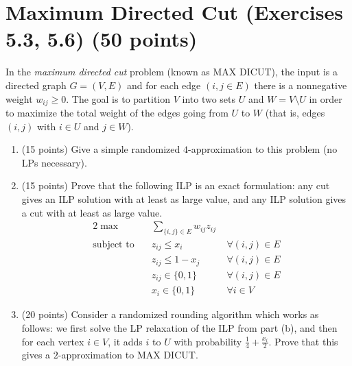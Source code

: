 \documentclass[11pt]{article}
\begin{document}
\section{Maximum Directed Cut (Exercises 5.3, 5.6) (50 points)}
In the \emph{maximum directed cut} problem (known as MAX DICUT), the input is a directed graph $G = (V, E)$ and for each edge $(i,j \in E)$ there is a nonnegative weight $w_{ij} \geq 0$.  The goal is to partition $V$ into two sets $U$ and $W = V \setminus U$ in order to maximize the total weight of the edges going from $U$ to $W$ (that is, edges $(i,j)$ with $i \in U$ and $j \in W$).

\begin{enumerate}
\item (15 points) Give a simple randomized $4$-approximation to this problem (no LPs necessary).  


\item (15 points) Prove that the following ILP is an exact formulation: any cut gives an ILP solution with at least as large value, and any ILP solution gives a cut with at least as large value.  
\begin{alignat*}{2}
\max  \quad & \sum_{\{i,j\} \in E} w_{ij} z_{ij} \\
\text{subject to} \quad & z_{ij} \leq x_i \qquad & \forall (i,j) \in E  \\
& z_{ij} \leq 1-x_j  \qquad& \forall (i,j) \in E \\
& z_{ij} \in \{0,1\} & \forall (i,j) \in E \\
&x_i \in \{0,1\} & \forall i \in V
\end{alignat*} 

\item (20 points) Consider a randomized rounding algorithm which works as follows: we first solve the LP relaxation of the ILP from part (b), and then for each vertex $i \in V$, it adds $i$ to $U$ with probability $\frac{1}{4} + \frac{x_i}{2}$.  Prove that this gives a $2$-approximation to MAX DICUT.  


\end{enumerate}
\end{document}
